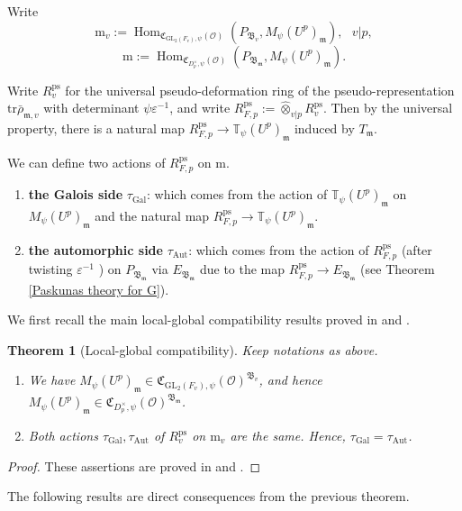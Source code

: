 \documentclass[a4paper, 12pt]{amsart}
\newtheorem{thm}{Theorem}[subsection]
\DeclareMathOperator{\Hom}{Hom}
\DeclareMathOperator{\Gal}{Gal}
\def\ps{\mathrm{ps}}
\newcommand{\T}{\mathbb{T}}
\newcommand{\tr}{\mathrm{tr}}
\newcommand{\GL}{\mathrm{GL}}
\newcommand{\cO}{\mathcal{O}}
\newcommand{\kC}{\mathfrak{C}}
\newcommand{\kB}{\mathfrak{B}}
\newcommand{\km}{\mathfrak{m}}
\newcommand{\mm}{\mathrm{m}}
\begin{document}
     Write $$\mm_v := \Hom_{\kC_{\GL_2(F_v),\psi}(\cO)}(P_{\kB_v}, M_\psi(U^p)_\km),~~~ v|p,$$
    $$\mm:=\Hom_{\kC_{D_p^\times,\psi}(\cO)}(P_{\kB_\km}, M_\psi(U^p)_\km).$$
     
     Write $R_v^\ps$ for the universal pseudo-deformation ring of the  pseudo-representation $\tr \bar{\rho}_{\km, v}$ with determinant $\psi\varepsilon^{-1}$, and write $R_{F,p}^\ps := \widehat{\otimes}_{v|p} R_v^\ps$. Then by the universal property, there is a natural map $ R_{F,p}^\ps \to \T_{\psi}(U^p)_\km$ induced by $T_\km$.
     
     We can define two actions of $R_{F,p}^\ps $ on $\mm$. 
     \begin{enumerate}
     	\item \textbf{the Galois side} $\tau_{\Gal}$: which comes from the action of $\T_\psi(U^p)_\km$ on $M_\psi(U^p)_\km$ and the natural map $ R_{F,p}^\ps \to \T_{\psi}(U^p)_\km$.
     	\item \textbf{the automorphic side} $\tau_{\mathrm{Aut}}$: which comes from the action of $R_{F,p}^\ps $ (after twisting $\varepsilon^{-1}$ ) on $P_{\kB_\km}$ via $E_{\kB_\km}$ due to the map $ R_{F,p}^\ps \to E_{\kB_\km}$ (see Theorem \ref{Paskunas theory for G}).
     \end{enumerate}

     We first recall the main local-global compatibility results proved in \cite{pan2022fontaine} and \cite{Zhang:2024aa}.
     
     \begin{thm}[Local-global compatibility]\label{lgc}
     	Keep notations as above.
     	\begin{enumerate}
     	\item We have $M_\psi(U^p)_\km \in \kC_{\GL_2(F_v),\psi}(\cO)^{\kB_v}$, and hence  $M_\psi(U^p)_\km \in \kC_{D_p^\times,\psi}(\cO)^{\kB_\km}$.
     	
     	\item  Both actions $\tau_{\Gal},\tau_{\mathrm{Aut}}$ of $R_v^\ps $ on $\mm_v$ are the same. Hence, $\tau_{\Gal} = \tau_{\mathrm{Aut}}$.
     \end{enumerate}
     \end{thm}

       \begin{proof}
       	These assertions are proved in \cite[Theorem 3.5.3]{pan2022fontaine} and \cite[Theorem 3.3.3]{Zhang:2024aa}. 
       \end{proof}

       The following results are direct consequences from the previous theorem.
       
\end{document}
